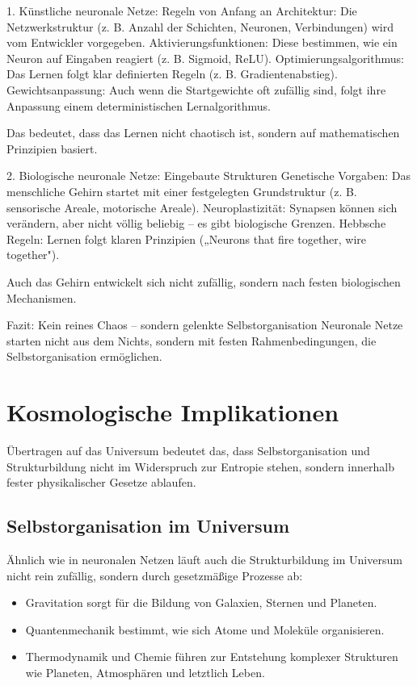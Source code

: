 \documentclass{article}
\begin{document}
	1. Künstliche neuronale Netze: Regeln von Anfang an
	Architektur: Die Netzwerkstruktur (z. B. Anzahl der Schichten, Neuronen, Verbindungen) wird vom Entwickler vorgegeben.
	Aktivierungsfunktionen: Diese bestimmen, wie ein Neuron auf Eingaben reagiert (z. B. Sigmoid, ReLU).
	Optimierungsalgorithmus: Das Lernen folgt klar definierten Regeln (z. B. Gradientenabstieg).
	Gewichtsanpassung: Auch wenn die Startgewichte oft zufällig sind, folgt ihre Anpassung einem deterministischen Lernalgorithmus.
	
	Das bedeutet, dass das Lernen nicht chaotisch ist, sondern auf mathematischen Prinzipien basiert.
	
	2. Biologische neuronale Netze: Eingebaute Strukturen
	Genetische Vorgaben: Das menschliche Gehirn startet mit einer festgelegten Grundstruktur (z. B. sensorische Areale, motorische Areale).
	Neuroplastizität: Synapsen können sich verändern, aber nicht völlig beliebig – es gibt biologische Grenzen.
	Hebbsche Regeln: Lernen folgt klaren Prinzipien („Neurons that fire together, wire together").
	
	Auch das Gehirn entwickelt sich nicht zufällig, sondern nach festen biologischen Mechanismen.
	
	Fazit: Kein reines Chaos – sondern gelenkte Selbstorganisation
	Neuronale Netze starten nicht aus dem Nichts, sondern mit festen Rahmenbedingungen, die Selbstorganisation ermöglichen.
	
	\section{Kosmologische Implikationen}
	Übertragen auf das Universum bedeutet das, dass Selbstorganisation und Strukturbildung nicht im Widerspruch zur Entropie stehen, sondern innerhalb fester physikalischer Gesetze ablaufen.
	
	\subsection{Selbstorganisation im Universum}
	Ähnlich wie in neuronalen Netzen läuft auch die Strukturbildung im Universum nicht rein zufällig, sondern durch gesetzmäßige Prozesse ab:
	
	\begin{itemize}
		\item Gravitation sorgt für die Bildung von Galaxien, Sternen und Planeten.
		\item Quantenmechanik bestimmt, wie sich Atome und Moleküle organisieren.
		\item Thermodynamik und Chemie führen zur Entstehung komplexer Strukturen wie Planeten, Atmosphären und letztlich Leben.
	\end{itemize}
	
\end{document}
